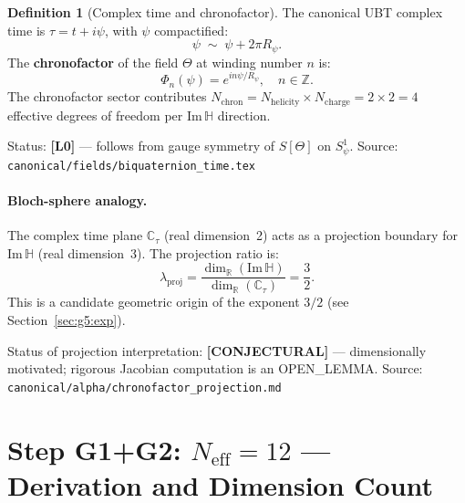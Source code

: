 \documentclass[12pt,a4paper]{article}
\theoremstyle{definition}
\newtheorem{definition}[theorem]{Definition}
\theoremstyle{remark}
\begin{document}
\begin{definition}[Complex time and chronofactor]
\label{def:g5:chron}
The canonical UBT complex time is $\tau = t + i\psi$, with $\psi$ compactified:
\begin{equation}
  \psi \;\sim\; \psi + 2\pi R_\psi.
  \label{eq:g5:S1psi}
\end{equation}
The \textbf{chronofactor} of the field $\Theta$ at winding number $n$ is:
\begin{equation}
  \Phi_n(\psi) = e^{in\psi/R_\psi}, \quad n \in \mathbb{Z}.
  \label{eq:g5:chron}
\end{equation}
The chronofactor sector contributes $N_\mathrm{chron} = N_\mathrm{helicity} \times
N_\mathrm{charge} = 2\times 2 = 4$ effective degrees of freedom per
$\mathrm{Im}\,\mathbb{H}$ direction.
\end{definition}

\begin{resultbox}
Status: \textbf{[L0]} — follows from gauge symmetry of $S[\Theta]$ on $S^1_\psi$.
Source: \texttt{canonical/fields/biquaternion\_time.tex}
\end{resultbox}

\paragraph{Bloch-sphere analogy.}
The complex time plane $\mathbb{C}_\tau$ (real dimension~2) acts as a projection
boundary for $\mathrm{Im}\,\mathbb{H}$ (real dimension~3).  The projection ratio is:
\begin{equation}
  \lambda_\mathrm{proj}
  = \frac{\dim_\mathbb{R}(\mathrm{Im}\,\mathbb{H})}{\dim_\mathbb{R}(\mathbb{C}_\tau)}
  = \frac{3}{2}.
  \label{eq:g5:lambda}
\end{equation}
This is a candidate geometric origin of the exponent $3/2$ (see Section~\ref{sec:g5:exp}).

\begin{statusbox}
Status of projection interpretation: \textbf{[CONJECTURAL]} — dimensionally
motivated; rigorous Jacobian computation is an OPEN\_LEMMA.
Source: \texttt{canonical/alpha/chronofactor\_projection.md}
\end{statusbox}

\section{Step G1+G2: $N_{\mathrm{eff}} = 12$ — Derivation and Dimension Count}
\label{sec:g5:Neff}
\end{document}
